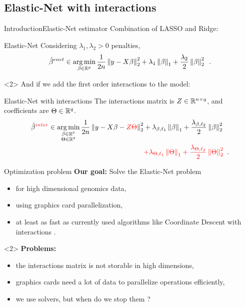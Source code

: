 \documentclass[10pt,aspectratio=43]{beamer}
\begin{document}
\subsection{Elastic-Net with interactions}
\begin{frame}{Introduction}{Elastic-Net estimator \citep{Zou_Hastie05}}
Combination of LASSO \citep{Tibshirani96} and
Ridge\citep{Tikhonov43}:
\begin{block}{Elastic-Net}
Considering $\lambda_1,\lambda_2>0$ penalties,
\begin{align*}
    \hat\beta^{enet} \in \mathop{\mathrm{arg\,min}}_{\beta \in \mathbb{R}^p}\frac{1}{2n}\left \lVert y - X\beta \right \rVert_2^2
    + \lambda_1 \left \lVert \beta \right \rVert_1
    + \frac{\lambda_2}{2} \left \lVert \beta \right \rVert_2^2 \enspace.
\end{align*}
\end{block}
\begin{onlyenv}<2>
    And if we add the first order interactions to the model:
    \begin{block}{Elastic-Net with interactions}
    The interactions matrix is $Z\in\mathbb{R}^{n\times q}$,
     and coefficients are $\Theta\in\mathbb{R}^q$.
        \begin{align*}
        \hat\beta^{\textcolor{red}{inter}}
        \in \mathop{\mathrm{arg\,min}}_{\substack{\beta \in \mathbb{R}^p \\ \Theta \in \mathbb{R}^q}}
        \frac{1}{2n}\left \lVert y - X\beta - \textcolor{red}{Z\Theta} \right \rVert_2^2
        & + \lambda_{\beta,\ell_1} \left \lVert \beta \right \rVert_1
        + \frac{\lambda_{\beta, \ell_2}}{2} \left \lVert \beta \right \rVert_2^2 \\
        & \textcolor{red}{+ \lambda_{\Theta,\ell_1} \left \lVert \Theta \right \rVert_1
        + \frac{\lambda_{\Theta, \ell_2}}{2} \left \lVert \Theta \right \rVert_2^2}
        \enspace.
    \end{align*}
\end{block}
\end{onlyenv}
\end{frame}

\begin{frame}{Optimization problem}
\textbf{Our goal:} Solve the Elastic-Net problem
\begin{itemize}
    \item for high dimensional genomics data,
    \item using graphics card parallelization,
    \item at least as fast as currently used algorithms like Coordinate Descent
    with interactions \citep{Bascou_Lebre_Salmon20}.
\end{itemize}

\begin{onlyenv}<2>
\textbf{Problems:}
    \begin{itemize}
        \item the interactions matrix is not storable in high dimensions,
        \item graphics cards need a lot of data to parallelize operations
        efficiently,
        \item we use solvers, but when do we stop them ?
    \end{itemize}
\end{onlyenv}
\end{frame}
\end{document}
